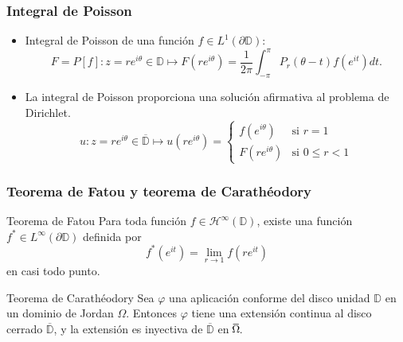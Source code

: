 \documentclass[spanish, a4paper, 12pt, final, slideColor, nototal, colorBG, pdf, noaccumulate, darkblue]{beamer}
\providecommand{\bholomorphic}[1]{\mathcal{H}^{\infty}(#1)}
\newcommand*\xbar[1]{%
   \hbox{%
     \vbox{%
       \hrule height 0.5pt %
       \kern0.2ex%
       \hbox{%
         \kern-0.1em%
         \ensuremath{#1}%
         \kern-0.1em%
       }%
     }%
   }%
}
\newcommand{\disk}{\mathbb{D}}
\newcommand{\closedisk}{\overline{\disk}}
\begin{document}
\begin{frame}
    \frametitle{Integral de Poisson}
    \begin{itemize}
        \item Integral de Poisson de una función $f \in L^1(\partial \disk)$:
            \begin{equation*}
                F = P[f]: z=re^{i \theta} \in \disk \mapsto F(re^{i \theta}) = \dfrac{1}{2 \pi} \int_{- \pi}^{\pi} P_r (\theta - t) f(e^{it}) dt.
            \end{equation*}

        \item La integral de Poisson proporciona una solución afirmativa al problema de Dirichlet.
            \begin{equation*}
                u : z = re^{i \theta} \in \closedisk \mapsto u(re^{i \theta}) =
                \begin{cases}
                    f(e^{i\theta}) & \text{si } r=1 \\
                    F(re^{i\theta}) & \text{si } 0 \leq r<1
                \end{cases}
            \end{equation*}
    \end{itemize}
\end{frame}

\begin{frame}
    \frametitle{Teorema de Fatou y teorema de Carathéodory}
    \begin{block}{Teorema de Fatou}
         Para toda función $f \in \bholomorphic{\disk}$, existe una función $f^* \in L^{\infty} (\partial \disk)$ definida por
         \begin{equation*}
            f^*(e^{it}) = \lim_{r \to 1} f(re^{it})
        \end{equation*}
        en casi todo punto.
    \end{block}

    \begin{block}{Teorema de Carathéodory}
        Sea $\varphi$ una aplicación conforme del disco unidad $\disk$ en un dominio de Jordan $\Omega$. Entonces $\varphi$ tiene una extensión continua al disco cerrado $\closedisk$, y la extensión es inyectiva de $\closedisk$ en $\xbar{\Omega}$.
    \end{block}

\end{frame}
\end{document}
